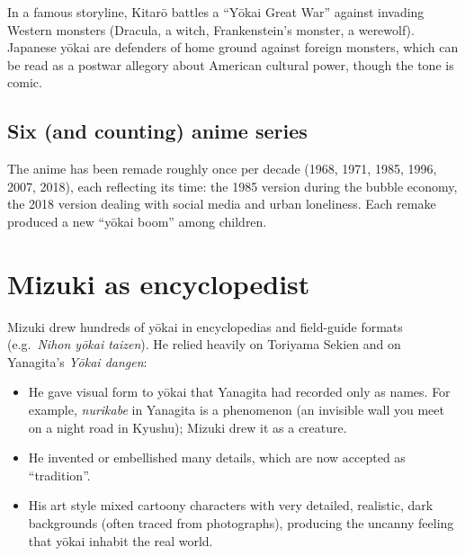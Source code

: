 \begin{example}
In a famous storyline, Kitarō battles a ``Yōkai Great War'' against invading Western
monsters (Dracula, a witch, Frankenstein's monster, a werewolf). Japanese yōkai are
defenders of home ground against foreign monsters, which can be read as a postwar
allegory about American cultural power, though the tone is comic.
\end{example}

\subsection{Six (and counting) anime series}

The anime has been remade roughly once per decade (1968, 1971, 1985, 1996, 2007, 2018),
each reflecting its time: the 1985 version during the bubble economy, the 2018 version
dealing with social media and urban loneliness. Each remake produced a new ``yōkai boom''
among children.

\section{Mizuki as encyclopedist}

Mizuki drew hundreds of yōkai in encyclopedias and field-guide formats (e.g.\ \emph{Nihon
yōkai taizen}). He relied heavily on Toriyama Sekien and on Yanagita's \emph{Yōkai dangen}:

\begin{itemize}
  \item He gave visual form to yōkai that Yanagita had recorded only as names. For
        example, \emph{nurikabe} in Yanagita is a phenomenon (an invisible wall you
        meet on a night road in Kyushu); Mizuki drew it as a creature.
  \item He invented or embellished many details, which are now accepted as ``tradition''.
  \item His art style mixed cartoony characters with very detailed, realistic, dark
        backgrounds (often traced from photographs), producing the uncanny feeling that
        yōkai inhabit the real world.
\end{itemize}

\begin{center}
\end{center}

